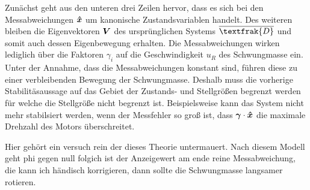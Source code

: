 Zunächst geht aus den unteren drei Zeilen hervor, dass es sich bei den Messabweichungen $\boldsymbol{\hat{x}}$ um kanonische Zustandsvariablen handelt. Des weiteren bleiben die Eigenvektoren $\boldsymbol{V}$ des ursprünglichen Systems $\overline{\textfrak{D}}$ und somit auch dessen Eigenbewegung erhalten. Die Messabweichungen wirken lediglich über die Faktoren $\gamma_i$ auf die Geschwindigkeit $u_R$ des Schwungmasse ein. Unter der Annahme, dass die Messabweichungen konstant sind, führen diese zu einer verbleibenden Bewegung der Schwungmasse. Deshalb muss die vorherige Stabilitäsaussage auf das Gebiet der Zustands- und Stellgrößen begrenzt werden für welche die Stellgröße nicht begrenzt ist. Beispielsweise kann das System nicht mehr stabilsiert werden, wenn der Messfehler so groß ist, dass $\boldsymbol{\gamma}\cdot \boldsymbol{\hat{x}}$ die maximale Drehzahl des Motors überschreitet.

Hier gehört ein versuch rein der dieses Theorie untermauert. Nach diesem Modell geht phi gegen null folgich ist der Anzeigewert am ende reine Messabweichung, die kann ich händisch korrigieren, dann sollte die Schwungmasse langsamer rotieren.